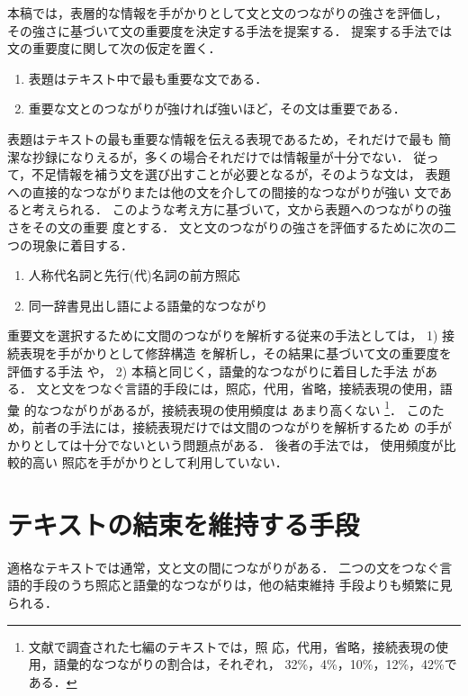 本稿では，表層的な情報を手がかりとして文と文のつながりの強さを評価し，
その強さに基づいて文の重要度を決定する手法を提案する．
提案する手法では文の重要度に関して次の仮定を置く．
\begin{enumerate}
\item 表題はテキスト中で最も重要な文である．
\item 重要な文とのつながりが強ければ強いほど，その文は重要である．
\end{enumerate}
表題はテキストの最も重要な情報を伝える表現であるため，それだけで最も
簡潔な抄録になりえるが，多くの場合それだけでは情報量が十分でない．
従って，不足情報を補う文を選び出すことが必要となるが，そのような文は，
表題への直接的なつながりまたは他の文を介しての間接的なつながりが強い
文であると考えられる．
このような考え方に基づいて，文から表題へのつながりの強さをその文の重要
度とする．
文と文のつながりの強さを評価するために次の二つの現象に着目する．
\begin{enumerate}
\item 人称代名詞と先行(代)名詞の前方照応
\item 同一辞書見出し語による語彙的なつながり
\end{enumerate}

重要文を選択するために文間のつながりを解析する従来の手法としては，
1) 接続表現を手がかりとして修辞構造
を解析し，その結果に基づいて文の重要度を評価する手法
\cite{Mase89,Ono94}や，
2) 本稿と同じく，語彙的なつながりに着目した手法
\cite{Hoey91,Collier94,FukumotoJ97,Sasaki93}がある．
文と文をつなぐ言語的手段には，照応，代用，省略，接続表現の使用，語彙
的なつながりがある\cite{Halliday76,Jelinek95}が，接続表現の使用頻度は
あまり高くない
\footnote{文献\cite{Halliday76}で調査された七編のテキストでは，照
応，代用，省略，接続表現の使用，語彙的なつながりの割合は，それぞれ，
32\%，4\%，10\%，12\%，42\%である\cite{Hoey91}．}．
このため，前者の手法には，接続表現だけでは文間のつながりを解析するため
の手がかりとしては十分でないという問題点がある．
後者の手法では，
使用頻度が比較的高い
照応を手がかりとして利用していない．

\section{テキストの結束を維持する手段}
\label{sec:coherence}

適格なテキストでは通常，文と文の間につながりがある．
二つの文をつなぐ言語的手段のうち照応と語彙的なつながりは，他の結束維持
手段よりも頻繁に見られる．


